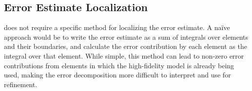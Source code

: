 \documentclass[review,sort&compress]{elsarticle}
\providecommand{\DIFaddbegin}{} %
\providecommand{\DIFaddend}{} %
\newcommand{\DIFaddincludegraphics}[2][]{{\color{blue}\fbox{\DIFOincludegraphics[#1]{#2}}}} %
\DeclareRobustCommand{\DIFaddbegin}{\DIFOaddbegin \let\includegraphics\DIFaddincludegraphics} %
\DeclareRobustCommand{\DIFaddend}{\DIFOaddend \let\includegraphics\DIFOincludegraphics} %
\begin{document}
\subsection{Error Estimate Localization}\label{sec:errLocal}
\DIFaddbegin 

\DIFaddend {} does not require a specific method for localizing the error estimate. A na\"{i}ve approach would be to write the error estimate as a sum of integrals over elements and their boundaries, and calculate the error contribution by each element as the integral over that element. While simple, this method can lead to non-zero error contributions from elements in which the high-fidelity model is already being used, making the error decomposition more difficult to interpret and use for refinement.
\end{document}
